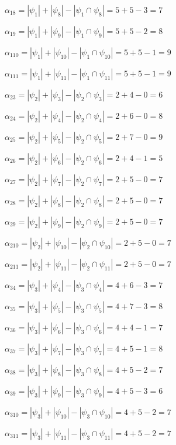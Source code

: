 \documentclass{article}
\begin{document}
$\alpha_{18} = |\psi_{1}| + |\psi_{8}| - |\psi_{1} \cap \psi_{8}| = 5 + 5 - 3 = 7$

$\alpha_{19} = |\psi_{1}| + |\psi_{9}| - |\psi_{1} \cap \psi_{9}| = 5 + 5 - 2 = 8$

$\alpha_{110} = |\psi_{1}| + |\psi_{10}| - |\psi_{1} \cap \psi_{10}| = 5 + 5 - 1 = 9$

$\alpha_{111} = |\psi_{1}| + |\psi_{11}| - |\psi_{1} \cap \psi_{11}| = 5 + 5 - 1 = 9$

$\alpha_{23} = |\psi_{2}| + |\psi_{3}| - |\psi_{2} \cap \psi_{3}| = 2 + 4 - 0 = 6$

$\alpha_{24} = |\psi_{2}| + |\psi_{4}| - |\psi_{2} \cap \psi_{4}| = 2 + 6 - 0 = 8$

$\alpha_{25} = |\psi_{2}| + |\psi_{5}| - |\psi_{2} \cap \psi_{5}| = 2 + 7 - 0 = 9$

$\alpha_{26} = |\psi_{2}| + |\psi_{6}| - |\psi_{2} \cap \psi_{6}| = 2 + 4 - 1 = 5$

$\alpha_{27} = |\psi_{2}| + |\psi_{7}| - |\psi_{2} \cap \psi_{7}| = 2 + 5 - 0 = 7$

$\alpha_{28} = |\psi_{2}| + |\psi_{8}| - |\psi_{2} \cap \psi_{8}| = 2 + 5 - 0 = 7$

$\alpha_{29} = |\psi_{2}| + |\psi_{9}| - |\psi_{2} \cap \psi_{9}| = 2 + 5 - 0 = 7$

$\alpha_{210} = |\psi_{2}| + |\psi_{10}| - |\psi_{2} \cap \psi_{10}| = 2 + 5 - 0 = 7$

$\alpha_{211} = |\psi_{2}| + |\psi_{11}| - |\psi_{2} \cap \psi_{11}| = 2 + 5 - 0 = 7$

$\alpha_{34} = |\psi_{3}| + |\psi_{4}| - |\psi_{3} \cap \psi_{4}| = 4 + 6 - 3 = 7$

$\alpha_{35} = |\psi_{3}| + |\psi_{5}| - |\psi_{3} \cap \psi_{5}| = 4 + 7 - 3 = 8$

$\alpha_{36} = |\psi_{3}| + |\psi_{6}| - |\psi_{3} \cap \psi_{6}| = 4 + 4 - 1 = 7$

$\alpha_{37} = |\psi_{3}| + |\psi_{7}| - |\psi_{3} \cap \psi_{7}| = 4 + 5 - 1 = 8$

$\alpha_{38} = |\psi_{3}| + |\psi_{8}| - |\psi_{3} \cap \psi_{8}| = 4 + 5 - 2 = 7$

$\alpha_{39} = |\psi_{3}| + |\psi_{9}| - |\psi_{3} \cap \psi_{9}| = 4 + 5 - 3 = 6$

$\alpha_{310} = |\psi_{3}| + |\psi_{10}| - |\psi_{3} \cap \psi_{10}| = 4 + 5 - 2 = 7$

$\alpha_{311} = |\psi_{3}| + |\psi_{11}| - |\psi_{3} \cap \psi_{11}| = 4 + 5 - 2 = 7$
\end{document}
